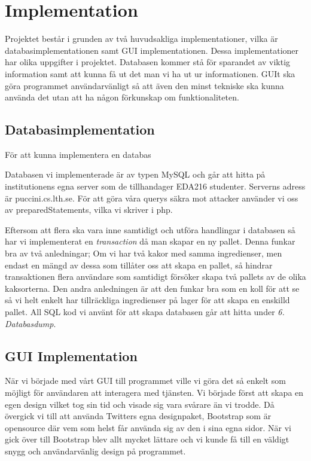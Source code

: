 \section{Implementation}

Projektet består i grunden av två huvudsakliga implementationer, vilka är databasimplementationen samt GUI implementationen. Dessa implementationer har olika uppgifter i projektet. Databasen kommer stå för sparandet av viktig information samt att kunna få ut det man vi ha ut ur informationen. GUIt ska göra programmet användarvänligt så att även den minst tekniske ska kunna använda det utan att ha någon förkunskap om funktionaliteten.

\subsection{Databasimplementation}

För att kunna implementera en databas

Databasen vi implementerade är av typen MySQL och går att hitta på institutionens egna server som de tillhandager EDA216 studenter. Serverns adress är puccini.cs.lth.se. För att göra våra querys säkra mot attacker använder vi oss av preparedStatements, vilka vi skriver i php. 

Eftersom att flera ska vara inne samtidigt och utföra handlingar i databasen så har vi implementerat en  \emph{transaction} då man skapar en ny pallet. Denna funkar bra av två anledningar; Om vi har två kakor med samma ingredienser, men endast en mängd av dessa som tillåter oss att skapa en pallet, så hindrar transaktionen flera användare som samtidigt försöker skapa två pallets av de olika kaksorterna. Den andra anledningen är att den funkar bra som en koll för att se så vi helt enkelt har tillräckliga ingredienser på lager för att skapa en enskilld pallet. All SQL kod vi använt för att skapa databasen går att hitta under \emph{6. Databasdump}.

\subsection{GUI Implementation}

När vi började med vårt GUI till programmet ville vi göra det så enkelt som möjligt för användaren att interagera med tjänsten. Vi började först att skapa en egen design vilket tog sin tid och visade sig vara svårare än vi trodde. Då övergick vi till att använda Twitters egna designpaket, Bootstrap som är opensource där vem som helst får använda sig av den i sina egna sidor. När vi gick över till Bootstrap blev allt mycket lättare och vi kunde få till en väldigt snygg och användarvänlig design på programmet.

